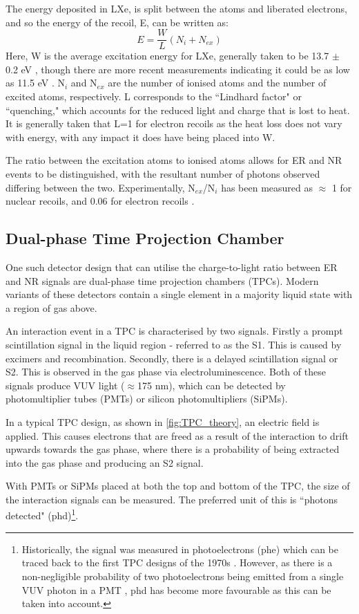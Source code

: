 \par
The energy deposited in LXe, is split between the atoms and liberated electrons, and so the energy of the recoil, E, can be written as:
\begin{equation}
    E = \frac{W}{L}(N_i + N_{ex})
\end{equation}
Here, W is the average excitation energy for LXe, generally taken to be 13.7 $\pm$ 0.2 eV \cite{light_and_charge_of_xenon_ref}, though there are more recent measurements indicating it could be as low as 11.5 eV \cite{electron_excitation_energy_of_xenon_ref}. 
N$_i$ and N$_{ex}$ are the number of ionised atoms and the number of excited atoms, respectively.
L corresponds to the ``Lindhard factor" or ``quenching," which accounts for the reduced light and charge that is lost to heat.
It is generally taken that L=1 for electron recoils as the heat loss does not vary with energy, with any impact it does have being placed into W.
\par
The ratio between the excitation atoms to ionised atoms allows for ER and NR events to be distinguished, with the resultant number of photons observed differing between the two.
Experimentally, N$_{ex}$/N$_i$ has been measured as $\approx$ 1 for nuclear recoils, and 0.06 for electron recoils \cite{ionisation_to_excitation_ratio_xenon_ref}.

\subsection{Dual-phase Time Projection Chamber}
\par
One such detector design that can utilise the charge-to-light ratio between ER and NR signals are dual-phase time projection chambers (TPCs).
Modern variants of these detectors contain a single element in a majority liquid state with a region of gas above.
\par
An interaction event in a TPC is characterised by two signals.
Firstly a prompt scintillation signal in the liquid region - referred to as the S1.
This is caused by excimers and recombination.
Secondly, there is a delayed scintillation signal or S2.
This is observed in the gas phase via electroluminescence.
Both of these signals produce VUV light ($\approx$175 nm), which can be detected by photomultiplier tubes (PMTs) or silicon photomultipliers (SiPMs).
\par
In a typical TPC design, as shown in \autoref{fig:TPC_theory}, an electric field is applied.
This causes electrons that are freed as a result of the interaction to drift upwards towards the gas phase, where there is a probability of being extracted into the gas phase and producing an S2 signal.
\par
With PMTs or SiPMs placed at both the top and bottom of the TPC, the size of the interaction signals can be measured.
The preferred unit of this is ``photons detected" (phd)\footnote{Historically, the signal was measured in photoelectrons (phe) which can be traced back to the first TPC designs of the 1970s \cite{tpc_origins_ref}. However, as there is a non-negligible probability of two photoelectrons being emitted from a single VUV photon in a PMT \cite{pmts_in_xenon_ref}, phd has become more favourable as this can be taken into account.}.

